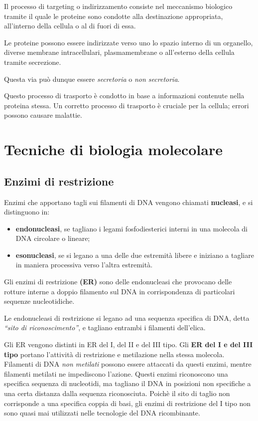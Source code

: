 \documentclass[11pt]{book}
\begin{document}
Il processo di targeting o indirizzamento consiste nel meccanismo
biologico tramite il quale le proteine sono condotte alla destinazione
appropriata, all'interno della cellula o al di fuori di essa.

Le proteine possono essere indirizzate verso uno lo spazio interno di un
organello, diverse membrane intracellulari, plasmamembrane o all'esterno
della cellula tramite secrezione.

Questa via può dunque essere \emph{secretoria} o \emph{non secretoria}.

Questo processo di trasporto è condotto in base a informazioni contenute
nella proteina stessa. Un corretto processo di trasporto è cruciale per
la cellula; errori possono causare malattie.

\chapter{Tecniche di biologia
molecolare}\label{tecniche-di-biologia-molecolare}

\section{Enzimi di restrizione}\label{enzimi-di-restrizione}

Enzimi che apportano tagli sui filamenti di DNA vengono chiamati
\textbf{nucleasi}, e si distinguono in:

\begin{itemize}
\itemsep1pt\parskip0pt
\item
  \textbf{endonucleasi}, se tagliano i legami fosfodiesterici interni in
  una molecola di DNA circolare o lineare;
\item
  \textbf{esonucleasi}, se si legano a una delle due estremità libere e
  iniziano a tagliare in maniera processiva verso l'altra estremità.
\end{itemize}

Gli enzimi di restrizione \textbf{(ER)} sono delle endonucleasi che
provocano delle rotture interne a doppio filamento sul DNA in
corrispondenza di particolari sequenze nucleotidiche.

Le endonucleasi di restrizione si legano ad una sequenza specifica di
DNA, detta \emph{``sito di riconoscimento''}, e tagliano entrambi i
filamenti dell'elica.

Gli ER vengono distinti in ER del I, del II e del III tipo. Gli
\textbf{ER del I e del III tipo} portano l'attività di restrizione e
metilazione nella stessa molecola. Filamenti di DNA \emph{non metilati}
possono essere attaccati da questi enzimi, mentre filamenti metilati ne
impediscono l'azione. Questi enzimi riconoscono una specifica sequenza
di nucleotidi, ma tagliano il DNA in posizioni non specifiche a una
certa distanza dalla sequenza riconosciuta. Poichè il sito di taglio non
corrisponde a una specifica coppia di basi, gli enzimi di restrizione
del I tipo non sono quasi mai utilizzati nelle tecnologie del DNA
ricombinante.
\end{document}
